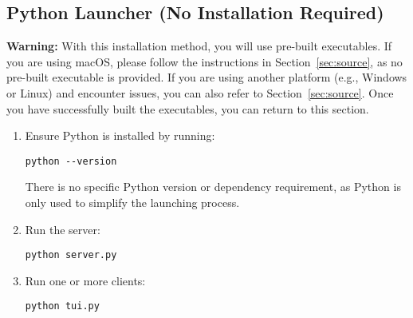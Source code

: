 \subsection{Python Launcher (No Installation Required)}
\label{sec:python}

\noindent
\begin{myWarning}
\textbf{Warning:} With this installation method, you will use pre-built executables. If you are using macOS, please follow the instructions in Section~\ref{sec:source}, as no pre-built executable is provided. If you are using another platform (e.g., Windows or Linux) and encounter issues, you can also refer to Section~\ref{sec:source}. Once you have successfully built the executables, you can return to this section.
\end{myWarning}

\begin{enumerate}
    \item Ensure Python is installed by running:

        \begin{lstlisting}
python --version
        \end{lstlisting}

    There is no specific Python version or dependency requirement, as Python is only used to simplify the launching process.

    \item Run the server:

        \begin{lstlisting}
python server.py
        \end{lstlisting}

    \item Run one or more clients:

        \begin{lstlisting}
python tui.py
        \end{lstlisting}
\end{enumerate}
